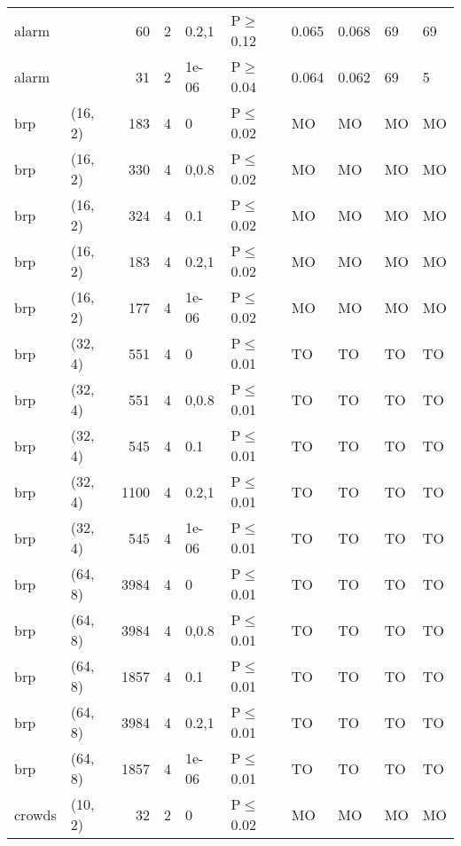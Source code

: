 \begin{longtable}{llrrllllll}
 alarm         &          &     	60 &   2 & 0.2,1 & P$\geq$0.12  & 0.065    & 0.068    & 69      & 69     \\
 alarm         &          &     	31 &   2 & 1e-06 & P$\geq$0.04  & 0.064    & 0.062    & 69      & 5      \\
 brp           & (16, 2)  &    	183 &   4 & 0     & P$\leq$0.02  & MO       & MO       & MO      & MO     \\
 brp           & (16, 2)  &    	330 &   4 & 0,0.8 & P$\leq$0.02  & MO       & MO       & MO      & MO     \\
 brp           & (16, 2)  &    	324 &   4 & 0.1   & P$\leq$0.02  & MO       & MO       & MO      & MO     \\
 brp           & (16, 2)  &    	183 &   4 & 0.2,1 & P$\leq$0.02  & MO       & MO       & MO      & MO     \\
 brp           & (16, 2)  &    	177 &   4 & 1e-06 & P$\leq$0.02  & MO       & MO       & MO      & MO     \\
 brp           & (32, 4)  &    	551 &   4 & 0     & P$\leq$0.01  & TO       & TO       & TO      & TO     \\
 brp           & (32, 4)  &    	551 &   4 & 0,0.8 & P$\leq$0.01  & TO       & TO       & TO      & TO     \\
 brp           & (32, 4)  &    	545 &   4 & 0.1   & P$\leq$0.01  & TO       & TO       & TO      & TO     \\
 brp           & (32, 4)  &   	1100 &   4 & 0.2,1 & P$\leq$0.01  & TO       & TO       & TO      & TO     \\
 brp           & (32, 4)  &    	545 &   4 & 1e-06 & P$\leq$0.01  & TO       & TO       & TO      & TO     \\
 brp           & (64, 8)  &   	3984 &   4 & 0     & P$\leq$0.01  & TO       & TO       & TO      & TO     \\
 brp           & (64, 8)  &   	3984 &   4 & 0,0.8 & P$\leq$0.01  & TO       & TO       & TO      & TO     \\
 brp           & (64, 8)  &   	1857 &   4 & 0.1   & P$\leq$0.01  & TO       & TO       & TO      & TO     \\
 brp           & (64, 8)  &   	3984 &   4 & 0.2,1 & P$\leq$0.01  & TO       & TO       & TO      & TO     \\
 brp           & (64, 8)  &   	1857 &   4 & 1e-06 & P$\leq$0.01  & TO       & TO       & TO      & TO     \\
 crowds        & (10, 2)  &     	32 &   2 & 0     & P$\leq$0.02  & MO       & MO       & MO      & MO     \\

\end{longtable}
